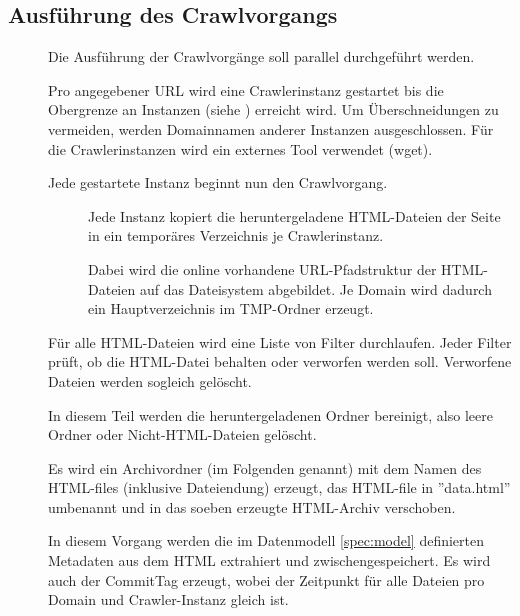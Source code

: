 \subsection{Ausführung des Crawlvorgangs}
\begin{description}
	\item []
		Die Ausführung der Crawlvorgänge soll parallel durchgeführt werden.
	\item [] 		
		Pro angegebener URL wird eine Crawlerinstanz gestartet bis die Obergrenze an Instanzen  
		(siehe ) erreicht wird.
		Um Überschneidungen zu vermeiden, werden Domainnamen anderer Instanzen ausgeschlossen.
		Für die Crawlerinstanzen wird ein externes Tool verwendet (wget).
	\item []
		Jede gestartete Instanz beginnt nun den Crawlvorgang.
		\begin{description}
			\item []
				Jede Instanz kopiert die heruntergeladene HTML-Dateien 
				der Seite in ein temporäres Verzeichnis je Crawlerinstanz.
			\item []
				Dabei wird die online vorhandene URL-Pfadstruktur der HTML-Dateien 
				auf das Dateisystem abgebildet.
				Je Domain wird dadurch ein Hauptverzeichnis im TMP-Ordner erzeugt.
		\end{description}
	\item []
		Für alle HTML-Dateien wird eine Liste von Filter durchlaufen.
		Jeder Filter prüft, ob die HTML-Datei behalten oder verworfen werden soll.
		Verworfene Dateien werden sogleich gelöscht.
	\item []
		In diesem Teil werden die heruntergeladenen Ordner bereinigt,
		also leere Ordner oder Nicht-HTML-Dateien gelöscht.
	\item []
		Es wird ein Archivordner (im Folgenden \htmlarc genannt) 
		mit dem Namen des HTML-files (inklusive Dateiendung) 
		erzeugt, das HTML-file in ''data.html'' umbenannt und 
		in das soeben erzeugte HTML-Archiv verschoben.
	\item []
		In diesem Vorgang werden die im Datenmodell \ref{spec:model} definierten Metadaten 
		aus dem HTML extrahiert und zwischengespeichert. Es wird auch der
		CommitTag erzeugt, wobei der Zeitpunkt für alle Dateien pro Domain und Crawler-Instanz gleich ist.

\end{description}
